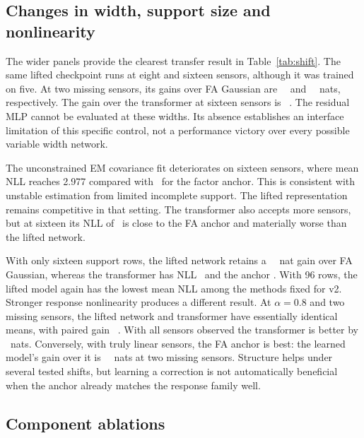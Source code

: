 \subsection{Changes in width, support size and nonlinearity}



The wider panels provide the clearest transfer result in Table~\ref{tab:shift}. The same lifted checkpoint runs at eight and sixteen sensors, although it was trained on five. At two missing sensors, its gains over FA Gaussian are \SFTwogainfa\ \SFTwogainfaci\ and \SFThreegainfa\ \SFThreegainfaci\ nats, respectively. The gain over the transformer at sixteen sensors is \SFThreegainpfn\ \SFThreegainpfnci. The residual MLP cannot be evaluated at these widths. Its absence establishes an interface limitation of this specific control, not a performance victory over every possible variable width network.

The unconstrained EM covariance fit deteriorates on sixteen sensors, where mean NLL reaches 2.977 compared with \SFThreefaOne\ for the factor anchor. This is consistent with unstable estimation from limited incomplete support. The lifted representation remains competitive in that setting. The transformer also accepts more sensors, but at sixteen its NLL of \SFThreepfn\ is close to the FA anchor and materially worse than the lifted network.

With only sixteen support rows, the lifted network retains a \SFSixgainfa\ \SFSixgainfaci\ nat gain over FA Gaussian, whereas the transformer has NLL \SFSixpfn\ and the anchor \SFSixfaOne. With 96 rows, the lifted model again has the lowest mean NLL among the methods fixed for v2. Stronger response nonlinearity produces a different result. At $\alpha=0.8$ and two missing sensors, the lifted network and transformer have essentially identical means, with paired gain \XFFourkkTwoliftvspfn\ \XFFourkkTwoliftvspfnci. With all sensors observed the transformer is better by \XFFourkkZeroliftvspfnabs\ nats. Conversely, with truly linear sensors, the FA anchor is best: the learned model's gain over it is \SFFivegainfa\ \SFFivegainfaci\ nats at two missing sensors. Structure helps under several tested shifts, but learning a correction is not automatically beneficial when the anchor already matches the response family well.

\subsection{Component ablations}

